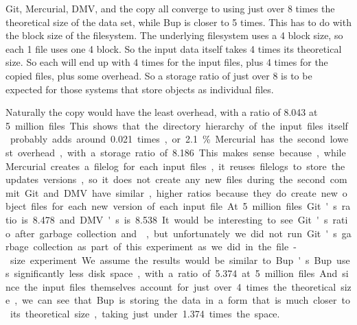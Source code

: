 Git, Mercurial, DMV, and the copy all converge to using just over \num{8} times
the theoretical size of the data set, while Bup is closer to \num{5} times. This
has to do with the block size of the filesystem. The underlying filesystem uses
a \SI{4}{\kib} block size, so each \SI{1}{\kib} file uses one \SI{4}{\kib}
block. So the input data itself takes \num{4} times its theoretical size. So
each will end up with \num{4} times for the input files, plus \num{4} times for
the copied files, plus some overhead. So a storage ratio of just over \num{8} is
to be expected for those systems that store objects as individual files.

Naturally the copy would have the least overhead, with a ratio of \num{8.043} at
\SI{5} million files. This shows that the directory hierarchy of the input files
itself probably adds around \num{0.021} times, or \SI{2.1}{\percent}. Mercurial
has the second lowest overhead, with a storage ratio of \num{8.186}. This makes
sense because, while Mercurial creates a \gls{filelog} for each input files, it
reuses \glspl{filelog} to store the updates versions, so it does not create any
new files during the second commit.

Git and \gls{DMV} have similar, higher ratios because they do create new object
files for each new version of each input file. At \SI{5} million files Git's
ratio is \num{8.478} and \gls{DMV}'s is \num{8.538}. It would be interesting to
see Git's ratio after garbage collection and , but
unfortunately we did not run Git's garbage collection as part of this experiment
as we did in the file-size experiment. We assume the results would be similar to
Bup's.

Bup uses significantly less disk space, with a ratio of \num{5.374} at \num{5}
million files. And since the input files themselves account for just over
\num{4} times the theoretical size, we can see that Bup is storing the data in a
form that is much closer to its theoretical size, taking just under \num{1.374}
times the space.

%
